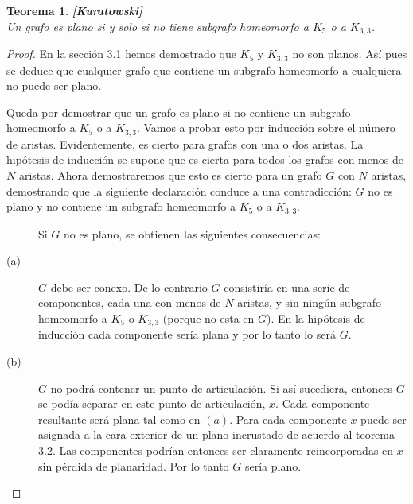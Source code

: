 \documentclass[10pt,a5paper]{book}
\newtheorem{teorema}{Teorema}[chapter]
\begin{document}
\begin{teorema}\textbf{[Kuratowski]}\\
Un grafo es plano si y solo si no tiene subgrafo homeomorfo a $K_5$ o a $K_{3,3}$.
\end{teorema}
\begin{proof}
En la sección 3.1 hemos demostrado que $K_5$ y $K_{3,3}$ no son planos. Así pues se deduce que cualquier grafo que contiene un subgrafo homeomorfo a cualquiera no puede ser plano.

Queda por demostrar que un grafo es plano si no contiene un subgrafo homeomorfo a $K_5$ o a $K_{3,3}$. Vamos a probar esto por inducción sobre el número de aristas. Evidentemente, es cierto para grafos con una o dos aristas. La hipótesis de inducción se supone que es cierta para todos los grafos con menos de $N$ aristas. Ahora demostraremos que esto es cierto para un grafo $G$ con $N$ aristas, demostrando que la siguiente declaración conduce a una contradicción: $G$ no es plano y no contiene un subgrafo homeomorfo a $K_5$ o a $K_{3,3}$.
\begin{description}
\item[ ]\hspace*{-.1in}Si $G$ no es plano, se obtienen las siguientes consecuencias:
\item[(a)] $G$ debe ser conexo. De lo contrario $G$ consistiría en una serie de componentes, cada una con menos de $N$ aristas, y sin ningún subgrafo homeomorfo a $K_5$ o $K_{3,3}$ (porque no esta en $G$). En la hipótesis de inducción cada componente sería plana y por lo tanto lo será $G$.
\item[(b)] $G$ no podrá contener un punto de articulación. Si así sucediera, entonces $G$ se podía separar en este punto de articulación, $x$. Cada componente resultante será plana tal como en $(a)$. Para cada componente $x$ puede ser asignada a la cara exterior de un plano incrustado de acuerdo al teorema 3.2. Las componentes podrían entonces ser claramente reincorporadas en $x$ sin pérdida de planaridad. Por lo tanto $G$ sería plano.

\end{description}
\end{proof}
\end{document}
